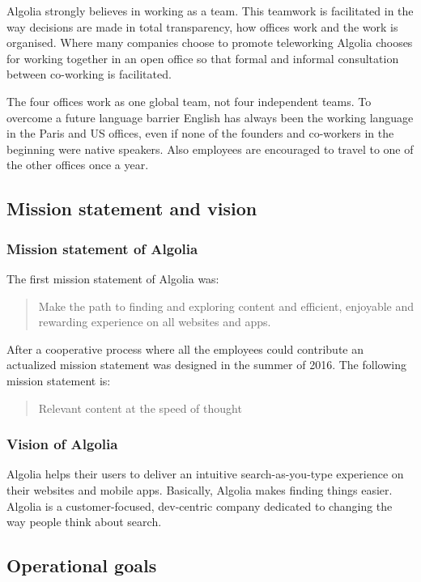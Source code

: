 Algolia strongly believes in working as a team. This teamwork is facilitated in the way decisions are made in total transparency, how offices work and the work is organised. Where many companies choose to promote teleworking Algolia chooses for working together in an open office so that formal and informal consultation between co-working is facilitated.

The four offices work as one global team, not four independent teams. To overcome a future language barrier English has always been the working language in the Paris and US offices, even if none of the founders and co-workers in the beginning were native speakers. Also employees are encouraged to travel to one of the other offices once a year. 

\subsection{Mission statement and vision}
\subsubsection{Mission statement of Algolia}

The first mission statement of Algolia was:


\begin{quote}
Make the path to finding and exploring content and efficient, enjoyable and rewarding experience on all websites and apps.
\end{quote}

After a cooperative process where all the employees could contribute an actualized mission statement was designed in the summer of 2016. The following mission statement is:

\begin{quote}
Relevant content at the speed of thought
\end{quote}

\subsubsection{Vision of Algolia}

Algolia helps their users to deliver an intuitive search-as-you-type experience on their websites and mobile apps. Basically, Algolia makes finding things easier. Algolia is a customer-focused, dev-centric company dedicated to changing the way people think about search.

\subsection{Operational goals}

